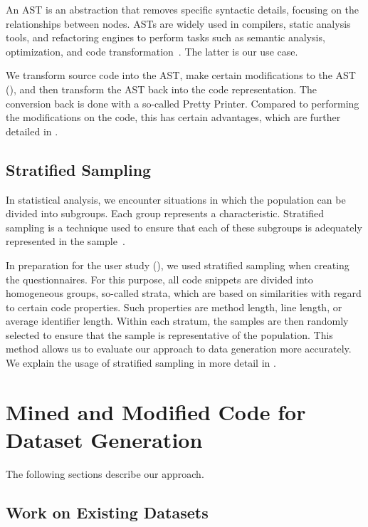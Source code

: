\documentclass[%
class=scrreprt,
chapterprefix=false,%
open=right,%
twoside=true,%
paper=a4,%
logofile={Logo\_zentral\_farbig\_EN.png},%
thesistype=master,%
UKenglish,%
]{se2thesis}
\theoremstyle{definition}
\begin{document}
	An AST is an abstraction that removes specific syntactic details, focusing on the relationships between nodes. ASTs are widely used in compilers, static analysis tools, and refactoring engines to perform tasks such as semantic analysis, optimization, and code transformation~\cite{miller2010abstract}. The latter is our use case.
	
	We transform source code into the AST, make certain modifications to the AST (), and then transform the AST back into the code representation. The conversion back is done with a so-called Pretty Printer. Compared to performing the modifications on the code, this has certain advantages, which are further detailed in .
	
\section{Stratified Sampling} \label{Stratified Sampling}	
	In statistical analysis, we encounter situations in which the population can be divided into subgroups. Each group represents a characteristic. Stratified sampling is a technique used to ensure that each of these subgroups is adequately represented in the sample~\cite{thompson2012sampling}.
	
	In preparation for the user study (), we used stratified sampling when creating the questionnaires. For this purpose, all code snippets are divided into homogeneous groups, so-called strata, which are based on similarities with regard to certain code properties. Such properties are method length, line length, or average identifier length. Within each stratum, the samples are then randomly selected to ensure that the sample is representative of the population. This method allows us to evaluate our approach to data generation more accurately. We explain the usage of stratified sampling in more detail in .
	
\chapter{Mined and Modified Code for Dataset Generation} \label{Mined and Modified Code for Dataset Generation}
	The following sections describe our approach.
		
\section{Work on Existing Datasets} \label{Work on Existing Datasets}
\end{document}

